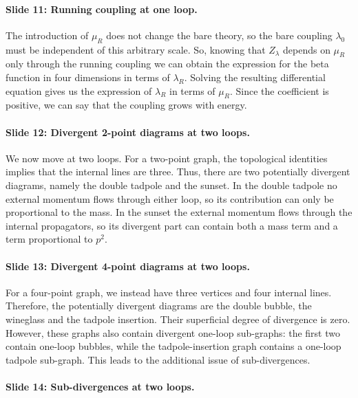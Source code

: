 \documentclass[11pt,a4paper]{article}
\begin{document}
\paragraph{Slide 11: Running coupling at one loop.}

The introduction of $\mu_R$ does not change the bare theory, so the bare coupling $\lambda_0$ must be independent of this arbitrary scale. So, knowing that $Z_\lambda$ depends on $\mu_R$ only through the running coupling we can obtain the expression for the beta function in four dimensions in terms of $\lambda_R$. Solving the resulting differential equation gives us the expression of $\lambda_R$ in terms of $\mu_R$. Since the coefficient is positive, we can say that the coupling grows with energy.

\paragraph{Slide 12: Divergent 2-point diagrams at two loops.}

We now move at two loops. For a two-point graph, the topological identities implies that the internal lines are three. Thus, there are two potentially divergent diagrams, namely the double tadpole and the sunset. In the double tadpole no external momentum flows through either loop, so its contribution can only be proportional to the mass. In the sunset the external momentum flows through the internal propagators, so its divergent part can contain both a mass term and a term proportional to $p^2$. 

\paragraph{Slide 13: Divergent 4-point diagrams at two loops.}

For a four-point graph, we instead have three vertices and four internal lines. Therefore, the potentially divergent diagrams are the double bubble, the wineglass and the tadpole insertion. Their superficial degree of divergence is zero. However, these graphs also contain divergent one-loop sub-graphs: the first two contain one-loop bubbles, while the tadpole-insertion graph contains a one-loop tadpole sub-graph. This leads to the additional issue of sub-divergences.

\paragraph{Slide 14: Sub-divergences at two loops.}
\end{document}
